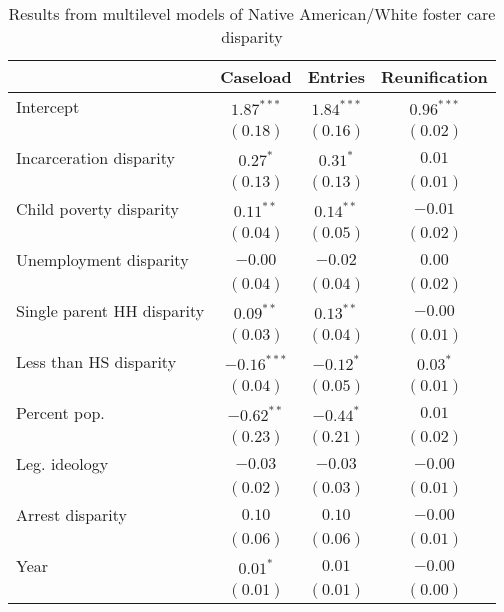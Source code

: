 
\begin{table}
\caption{Results from multilevel models of Native American/White foster care disparity}
\begin{center}
\begin{tabular}{l c c c }
\hline
 & Caseload & Entries & Reunification \\
\hline
Intercept                  & $1.87^{***}$  & $1.84^{***}$ & $0.96^{***}$ \\
                           & $(0.18)$      & $(0.16)$     & $(0.02)$     \\
Incarceration disparity    & $0.27^{*}$    & $0.31^{*}$   & $0.01$       \\
                           & $(0.13)$      & $(0.13)$     & $(0.01)$     \\
Child poverty disparity    & $0.11^{**}$   & $0.14^{**}$  & $-0.01$      \\
                           & $(0.04)$      & $(0.05)$     & $(0.02)$     \\
Unemployment disparity     & $-0.00$       & $-0.02$      & $0.00$       \\
                           & $(0.04)$      & $(0.04)$     & $(0.02)$     \\
Single parent HH disparity & $0.09^{**}$   & $0.13^{**}$  & $-0.00$      \\
                           & $(0.03)$      & $(0.04)$     & $(0.01)$     \\
Less than HS disparity     & $-0.16^{***}$ & $-0.12^{*}$  & $0.03^{*}$   \\
                           & $(0.04)$      & $(0.05)$     & $(0.01)$     \\
Percent pop.               & $-0.62^{**}$  & $-0.44^{*}$  & $0.01$       \\
                           & $(0.23)$      & $(0.21)$     & $(0.02)$     \\
Leg. ideology              & $-0.03$       & $-0.03$      & $-0.00$      \\
                           & $(0.02)$      & $(0.03)$     & $(0.01)$     \\
Arrest disparity           & $0.10$        & $0.10$       & $-0.00$      \\
                           & $(0.06)$      & $(0.06)$     & $(0.01)$     \\
Year                       & $0.01^{*}$    & $0.01$       & $-0.00$      \\
                           & $(0.01)$      & $(0.01)$     & $(0.00)$     \\

\end{tabular}
\end{center}
\end{table}
